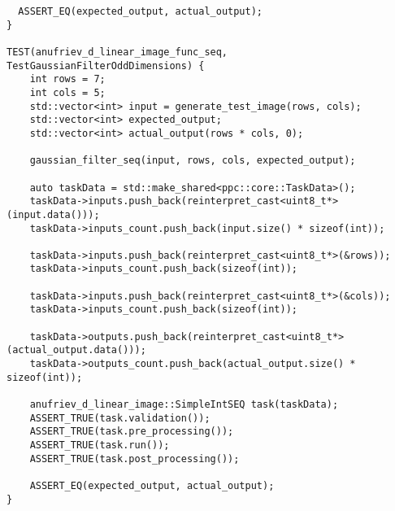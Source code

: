 \documentclass[12pt]{article}
\begin{document}
\begin{lstlisting}
  ASSERT_EQ(expected_output, actual_output);
}

TEST(anufriev_d_linear_image_func_seq, TestGaussianFilterOddDimensions) {
    int rows = 7;
    int cols = 5;
    std::vector<int> input = generate_test_image(rows, cols);
    std::vector<int> expected_output;
    std::vector<int> actual_output(rows * cols, 0);

    gaussian_filter_seq(input, rows, cols, expected_output);

    auto taskData = std::make_shared<ppc::core::TaskData>();
    taskData->inputs.push_back(reinterpret_cast<uint8_t*>(input.data()));
    taskData->inputs_count.push_back(input.size() * sizeof(int));
  
    taskData->inputs.push_back(reinterpret_cast<uint8_t*>(&rows));
    taskData->inputs_count.push_back(sizeof(int));
    
    taskData->inputs.push_back(reinterpret_cast<uint8_t*>(&cols));
    taskData->inputs_count.push_back(sizeof(int));
    
    taskData->outputs.push_back(reinterpret_cast<uint8_t*>(actual_output.data()));
    taskData->outputs_count.push_back(actual_output.size() * sizeof(int));

    anufriev_d_linear_image::SimpleIntSEQ task(taskData);
    ASSERT_TRUE(task.validation());
    ASSERT_TRUE(task.pre_processing());
    ASSERT_TRUE(task.run());
    ASSERT_TRUE(task.post_processing());

    ASSERT_EQ(expected_output, actual_output);
}
\end{lstlisting}
\end{document}
